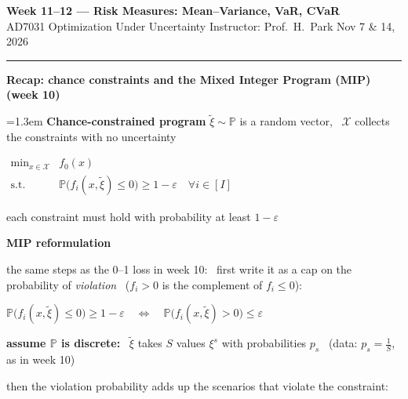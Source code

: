 \documentclass[10pt]{article}
\newcommand{\beatu}[1]{%
  \par\bigskip\vspace{4pt}
  {\color{ruleink}\rule{\textwidth}{1pt}}\par\nobreak\vspace{4pt}
  {\large\bfseries #1}\par\nobreak\vspace{6pt}}
\newenvironment{board}{%
  \par\vspace{4pt}
  \begingroup\leftskip=1.3em\relax\parskip=2pt\relax}{%
  \par\endgroup\vspace{4pt}}
\newcommand{\Prob}{\mathbb{P}}
\newcommand{\xit}{\tilde\xi}
\begin{document}
{\Large\bfseries Week 11--12 --- Risk Measures: Mean--Variance, VaR, CVaR}\\[2pt]
{\small AD7031 Optimization Under Uncertainty \quad\textbullet\quad Instructor: Prof.\ H.\ Park \quad\textbullet\quad Nov 7 \& 14, 2026}

\beatu{Recap: chance constraints and the Mixed Integer Program (MIP) (week 10)}
\begin{board}
\textbf{Chance-constrained program} \quad $\xit \sim \Prob$ is a random vector, \ $\mathcal{X}$ collects the constraints with no uncertainty
\vspace{2pt}

\begin{center}
$\begin{array}{rl}
  \displaystyle\min_{x \in \mathcal{X}} & f_0(x) \\[6pt]
  \text{s.t.} & \Prob\big(f_i(x, \xit) \le 0\big) \ge 1 - \varepsilon \quad \forall i \in [I]
\end{array}$
\end{center}
\vspace{2pt}

\quad each constraint must hold with probability at least $1 - \varepsilon$
\vspace{8pt}

\textbf{MIP reformulation}
\vspace{4pt}

\begin{minipage}{\dimexpr\linewidth-1.3em\relax}
the same steps as the 0--1 loss in week 10: \ first write it as a cap on the probability of \emph{violation} \ ($f_i > 0$ is the complement of $f_i \le 0$):
\vspace{2pt}

\begin{center}
$\Prob\big(f_i(x, \xit) \le 0\big) \ge 1 - \varepsilon \quad\iff\quad \Prob\big(f_i(x, \xit) > 0\big) \le \varepsilon$
\end{center}
\end{minipage}
\vspace{2pt}

\begin{minipage}{\dimexpr\linewidth-1.3em\relax}
\quad \textbf{assume $\Prob$ is discrete:} \ $\xit$ takes $S$ values $\xi^s$ with probabilities $p_s$ \ (data: $p_s = \tfrac1S$, as in week 10)
\vspace{2pt}

\quad then the violation probability adds up the scenarios that violate the constraint:
\vspace{2pt}


\end{minipage}
\end{board}
\end{document}
